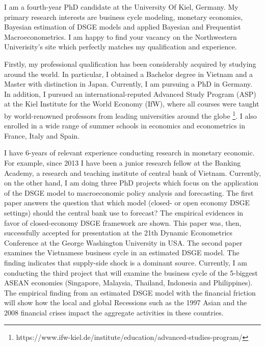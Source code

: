 \documentclass[11pt, a4paper]{awesome-cv}
\begin{document}
\makecvheader
\makelettertitle
\begin{cvletter}

I am a fourth-year PhD candidate at the University Of Kiel, Germany. My primary research interests are business cycle modeling, monetary economics, Bayesian estimation of DSGE models and applied Bayesian and Frequentist Macroeconometrics. I am happy to find your vacancy on the Northwestern Univerisity's site which perfectly matches my qualification and experience.



Firstly, my professional qualification has been considerably acquired by studying around the world. In particular, I obtained a Bachelor degree in Vietnam and a Master with distinction in Japan. Currently, I am pursuing a PhD in Germany. In addition, I pursued an international-reputed Advanced Study Program (ASP) at the Kiel Institute for the World Economy (IfW), where all courses were taught by world-renowned professors from leading universities around the globe \footnote{https://www.ifw-kiel.de/institute/education/advanced-studies-program/}. I also enrolled in a wide range of summer schools in economics and econometrics in France, Italy and Spain.

I have 6-years of relevant experience conducting research in monetary economic.  For example, since 2013 I have been a junior research fellow at the Banking Academy, a research and teaching institute of central bank of Vietnam. Currently, on the other hand, I am doing three PhD projects which focus on the application of the DSGE model to macroeconomic policy analysis and forecasting. The first paper answers the question that which model (closed- or open economy DSGE settings) should the central bank use to forecast? The empirical evidences in favor of closed-economy DSGE framework are shown. This paper was, then, successfully accepted for presentation at the 21th Dynamic Econometrics Conference at the George Washington University in USA.  The second paper examines the Vietnamese business cycle in an estimated DSGE model. The finding indicates that supply-side shock is a dominant source. Currently, I am conducting the third project that will examine the business cycle of the 5-biggest ASEAN economies (Singapore, Malaysia, Thailand, Indonesia and Philippines). The empirical finding from an estimated DSGE model with the financial friction will show how the local and global Recessions such as the 1997 Asian and the 2008 financial crises impact the aggregate activities in these countries. 



\end{cvletter}
\end{document}
